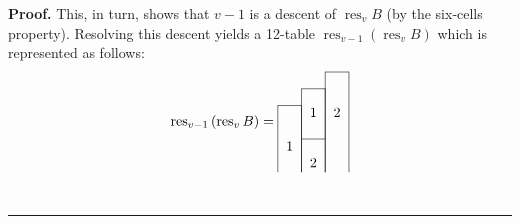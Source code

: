 \documentclass[numbers=enddot,12pt,final,onecolumn,notitlepage]{scrartcl}%
\theoremstyle{definition}
\newenvironment{proof}[1][Proof]{\noindent\textbf{#1.} }{\ \rule{0.5em}{0.5em}}
\begin{document}
\begin{proof}
This, in turn, shows that $v-1$ is a descent of $\operatorname*{res}%
\nolimits_{v}B$ (by the six-cells property). Resolving this descent
yields a 12-table $\operatorname*{res}\nolimits_{v-1}\left(
\operatorname*{res}\nolimits_{v}B\right)  $ which is represented as follows:%
\begin{equation}
\operatorname*{res}\nolimits_{v-1}\left(  \operatorname*{res}\nolimits_{v}%
B\right)  =%
\begin{tabular}{ccc}
\cline{3-3} & & \multicolumn{1}{|c|}{} \\
\cline{2-2} & \multicolumn{1}{|c|}{} & \multicolumn{1}{|c|}{} \\
\cline{1-1} \multicolumn{1}{|c|}{} & \multicolumn{1}{|c|}{1} & \multicolumn
{1}{|c|}{2} \\
\multicolumn{1}{|c|}{} & \multicolumn{1}{|c|}{} & \multicolumn{1}{|c|}{} \\
\cline{2-2} \multicolumn{1}{|c|}{1} & \multicolumn{1}{|c|}{} & \multicolumn
{1}{|c|}{} \\
\multicolumn{1}{|c|}{} & \multicolumn{1}{|c|}{2} & \multicolumn{1}{|c|}{} \\

\end{tabular}
\end{equation}
\end{proof}
\end{document}
